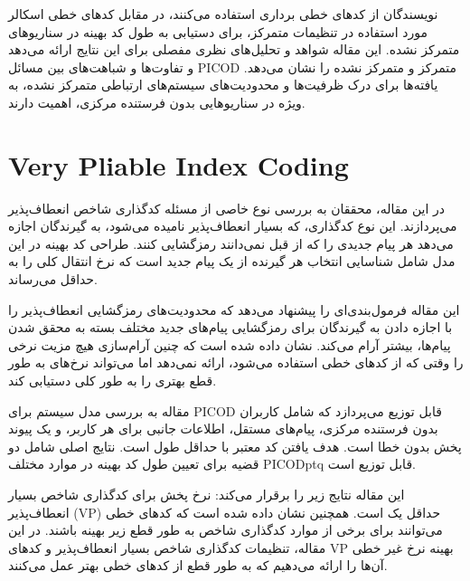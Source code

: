 نویسندگان از کدهای خطی برداری استفاده می‌کنند، در مقابل کدهای خطی اسکالر مورد استفاده در تنظیمات متمرکز، برای دستیابی به طول کد بهینه در سناریوهای متمرکز نشده.
این مقاله شواهد و تحلیل‌های نظری مفصلی برای این نتایج ارائه می‌دهد و تفاوت‌ها و شباهت‌های بین مسائل PICOD متمرکز و متمرکز نشده را نشان می‌دهد.
یافته‌ها برای درک ظرفیت‌ها و محدودیت‌های سیستم‌های ارتباطی متمرکز نشده، به ویژه در سناریوهایی بدون فرستنده مرکزی، اهمیت دارند.



\section*{Very Pliable Index Coding}

در این مقاله، محققان به بررسی نوع خاصی از مسئله کدگذاری شاخص انعطاف‌پذیر می‌پردازند. این نوع کدگذاری، که بسیار انعطاف‌پذیر نامیده می‌شود، به گیرندگان اجازه می‌دهد هر پیام جدیدی را که از قبل نمی‌دانند رمزگشایی کنند. طراحی کد بهینه در این مدل شامل شناسایی انتخاب هر گیرنده از یک پیام جدید است که نرخ انتقال کلی را به حداقل می‌رساند.

این مقاله فرمول‌بندی‌ای را پیشنهاد می‌دهد که محدودیت‌های رمزگشایی انعطاف‌پذیر را با اجازه دادن به گیرندگان برای رمزگشایی پیام‌های جدید مختلف بسته به محقق شدن پیام‌ها، بیشتر آرام می‌کند. نشان داده شده است که چنین آرام‌سازی هیچ مزیت نرخی را وقتی که از کدهای خطی استفاده می‌شود، ارائه نمی‌دهد اما می‌تواند نرخ‌های به طور قطع بهتری را به طور کلی دستیابی کند.

مقاله به بررسی مدل سیستم برای PICOD قابل توزیع می‌پردازد که شامل کاربران بدون فرستنده مرکزی، پیام‌های مستقل، اطلاعات جانبی برای هر کاربر، و یک پیوند پخش بدون خطا است. هدف یافتن کد معتبر با حداقل طول است. نتایج اصلی شامل دو قضیه برای تعیین طول کد بهینه در موارد مختلف PICODptq قابل توزیع است.

این مقاله نتایج زیر را برقرار می‌کند: نرخ پخش برای کدگذاری شاخص بسیار انعطاف‌پذیر (VP) حداقل یک است. همچنین نشان داده شده است که کدهای خطی می‌توانند برای برخی از موارد کدگذاری شاخص به طور قطع زیر بهینه باشند. در این مقاله، تنظیمات کدگذاری شاخص بسیار انعطاف‌پذیر و کدهای VP بهینه نرخ غیر خطی آن‌ها را ارائه می‌دهیم که به طور قطع از کدهای خطی بهتر عمل می‌کنند.

